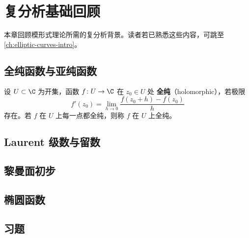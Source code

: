 \chapter{复分析基础回顾}
\label{ch:complex-analysis}

本章回顾模形式理论所需的复分析背景。读者若已熟悉这些内容，可跳至
\cref{ch:elliptic-curves-intro}。

\section{全纯函数与亚纯函数}

\begin{definition}[全纯函数]
设 $U \subset \C$ 为开集，函数 $f\colon U \to \C$ 在 $z_0 \in U$ 处
\textbf{全纯}（holomorphic），若极限
\[
  f'(z_0) = \lim_{h \to 0} \frac{f(z_0 + h) - f(z_0)}{h}
\]
存在。若 $f$ 在 $U$ 上每一点都全纯，则称 $f$ 在 $U$ 上全纯。
\end{definition}

\section{Laurent 级数与留数}


\section{黎曼面初步}


\section{椭圆函数}


\section{习题}
